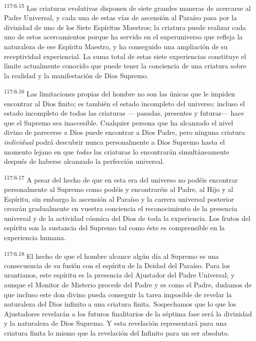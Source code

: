 \par
\textsuperscript{117:6.15} Las criaturas evolutivas disponen de siete grandes maneras de acercarse al Padre Universal, y cada una de estas vías de ascensión al Paraíso pasa por la divinidad de uno de los Siete Espíritus Maestros; la criatura puede realizar cada uno de estos acercamientos porque ha servido en el superuniverso que refleja la naturaleza de ese Espíritu Maestro, y ha conseguido una ampliación de su receptividad experiencial. La suma total de estas siete experiencias constituye el límite actualmente conocido que puede tener la conciencia de una criatura sobre la realidad y la manifestación de Dios Supremo.

\par
\textsuperscript{117:6.16} Las limitaciones propias del hombre no son las únicas que le impiden encontrar al Dios finito; es también el estado incompleto del universo; incluso el estado incompleto de todas las criaturas --- pasadas, presentes y futuras--- hace que el Supremo sea inaccesible. Cualquier persona que ha alcanzado el nivel divino de parecerse a Dios puede encontrar a Dios Padre, pero ninguna criatura \textit{individual} podrá descubrir nunca personalmente a Dios Supremo hasta el momento lejano en que \textit{todas} las criaturas lo encontrarán simultáneamente después de haberse alcanzado la perfección universal.

\par
\textsuperscript{117:6.17} A pesar del hecho de que en esta era del universo no podéis encontrar personalmente al Supremo como podéis y encontraréis al Padre, al Hijo y al Espíritu, sin embargo la ascensión al Paraíso y la carrera universal posterior crearán gradualmente en vuestra conciencia el reconocimiento de la presencia universal y de la actividad cósmica del Dios de toda la experiencia. Los frutos del espíritu son la sustancia del Supremo tal como éste es comprensible en la experiencia humana.

\par
\textsuperscript{117:6.18} El hecho de que el hombre alcance algún día al Supremo es una consecuencia de su fusión con el espíritu de la Deidad del Paraíso. Para los urantianos, este espíritu es la presencia del Ajustador del Padre Universal; y aunque el Monitor de Misterio procede del Padre y es como el Padre, dudamos de que incluso este don divino pueda conseguir la tarea imposible de revelar la naturaleza del Dios infinito a una criatura finita. Sospechamos que lo que los Ajustadores revelarán a los futuros finalitarios de la séptima fase será la divinidad y la naturaleza de Dios Supremo. Y esta revelación representará para una criatura finita lo mismo que la revelación del Infinito para un ser absoluto.


